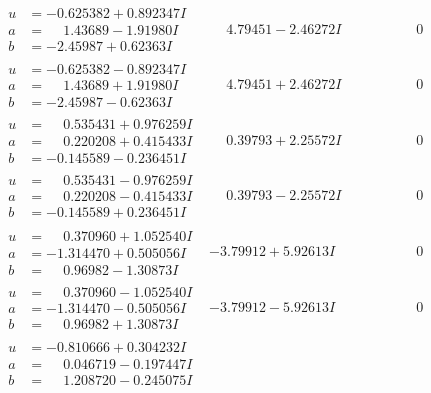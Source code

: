 \documentclass[1p]{elsarticle_modified}
\theoremstyle{definition}
\begin{document}
$$\begin{array}{c|c|c}
\begin{aligned}
u &= -0.625382 + 0.892347 I \\
a &= \phantom{-}1.43689 - 1.91980 I \\
b &= -2.45987 + 0.62363 I\end{aligned}
 & \phantom{-}4.79451 - 2.46272 I & \phantom{-0.000000 } 0 \\ \hline\begin{aligned}
u &= -0.625382 - 0.892347 I \\
a &= \phantom{-}1.43689 + 1.91980 I \\
b &= -2.45987 - 0.62363 I\end{aligned}
 & \phantom{-}4.79451 + 2.46272 I & \phantom{-0.000000 } 0 \\ \hline\begin{aligned}
u &= \phantom{-}0.535431 + 0.976259 I \\
a &= \phantom{-}0.220208 + 0.415433 I \\
b &= -0.145589 - 0.236451 I\end{aligned}
 & \phantom{-}0.39793 + 2.25572 I & \phantom{-0.000000 } 0 \\ \hline\begin{aligned}
u &= \phantom{-}0.535431 - 0.976259 I \\
a &= \phantom{-}0.220208 - 0.415433 I \\
b &= -0.145589 + 0.236451 I\end{aligned}
 & \phantom{-}0.39793 - 2.25572 I & \phantom{-0.000000 } 0 \\ \hline\begin{aligned}
u &= \phantom{-}0.370960 + 1.052540 I \\
a &= -1.314470 + 0.505056 I \\
b &= \phantom{-}0.96982 - 1.30873 I\end{aligned}
 & -3.79912 + 5.92613 I & \phantom{-0.000000 } 0 \\ \hline\begin{aligned}
u &= \phantom{-}0.370960 - 1.052540 I \\
a &= -1.314470 - 0.505056 I \\
b &= \phantom{-}0.96982 + 1.30873 I\end{aligned}
 & -3.79912 - 5.92613 I & \phantom{-0.000000 } 0 \\ \hline\begin{aligned}
u &= -0.810666 + 0.304232 I \\
a &= \phantom{-}0.046719 - 0.197447 I \\
b &= \phantom{-}1.208720 - 0.245075 I\end{aligned}

\end{array}$$
\end{document}
